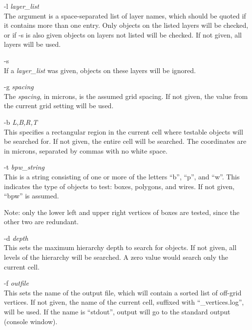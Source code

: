 \begin{description}
\item{{\vt -l} {\it layer\_list}}\\
The argument is a space-separated list of layer names, which should be
quoted if it contains more than one entry.  Only objects on the listed
layers will be checked, or if {\vt -s} is also given objects on layers
not listed will be checked.  If not given, all layers will be used.

\item{\vt -s}\\
If a {\it layer\_list} was given, objects on these layers will be
ignored.

\item{{\vt -g} {\it spacing}}\\
The {\it spacing}, in microns, is the assumed grid spacing.  If not
given, the value from the current grid setting will be used.

\item{{\vt -b} {\it L,B,R,T}}\\
This specifies a rectangular region in the current cell where testable
objects will be searched for.  If not given, the entire cell will be
searched.  The coordinates are in microns, separated by commas with no
white space.

\item{{\vt -t} {\it bpw\_string}}\\
This is a string consisting of one or more of the letters ``{\vt b}'',
``{\vt p}'', and ``{\vt w}''.  This indicates the type of objects to
test:  boxes, polygons, and wires.  If not given, ``{\vt bpw}'' is
assumed.

Note:  only the lower left and upper right vertices of boxes are
tested, since the other two are redundant.

\item{{\vt -d} {\it depth}}\\
This sets the maximum hierarchy depth to search for objects.  If not
given, all levels of the hierarchy will be searched.  A zero value
would search only the current cell.

\item{{\vt -f} {\it outfile}}\\
This sets the name of the output file, which will contain a sorted
list of off-grid vertices.  If not given, the name of the current
cell, suffixed with ``{\vt \_vertices.log}'', will be used.  If the
name is ``{\vt stdout}'', output will go to the standard output
(console window).
\end{description}

